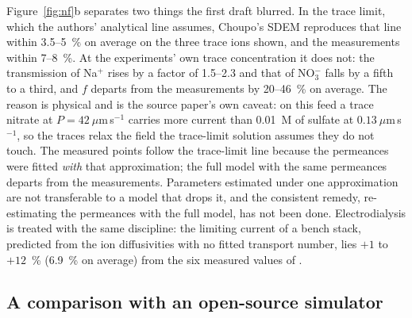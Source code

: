 \documentclass[preprint,12pt]{elsarticle}
\begin{document}
Figure~\ref{fig:nf}b separates two things the first draft blurred.  In the
trace limit, which the authors' analytical line assumes, Choupo's SDEM
reproduces that line within 3.5--5~\% on average on the three trace ions
shown, and the measurements within 7--8~\%.  At the experiments' own trace
concentration it does not: the transmission of Na$^+$ rises by a factor
of 1.5--2.3 and that of NO$_3^-$ falls by a fifth to a third, and $f$
departs from the measurements by 20--46~\% on average.  The reason is physical and is the source paper's own caveat: on
this feed a trace nitrate at $P = 42~\mu$m\,s$^{-1}$ carries more current
than 0.01~M of sulfate at $0.13~\mu$m\,s$^{-1}$, so the traces relax the
field the trace-limit solution assumes they do not touch.  The measured
points follow the trace-limit line because the permeances were fitted
\emph{with} that approximation; the full model with the same permeances
departs from the measurements.  Parameters estimated under one
approximation are not transferable to a model that drops it, and the
consistent remedy, re-estimating the permeances with the full model, has
not been done.  Electrodialysis is treated with the same discipline: the
limiting current of a bench stack, predicted from the ion diffusivities
with no fitted transport number, lies $+1$ to $+12$~\% (6.9~\% on average)
from the six measured values of \citet{geraldes2010}.

\subsection{A comparison with an open-source simulator}
\label{sec:ex-comparison}
\end{document}

